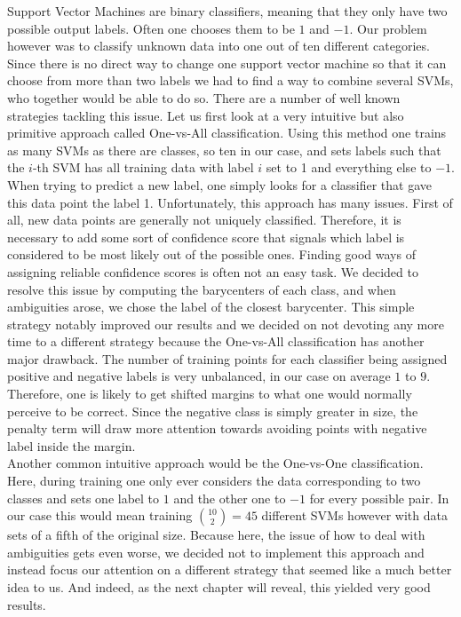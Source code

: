 Support Vector Machines are binary classifiers, meaning that they only have two possible output labels. Often one chooses them to be $1$ and $-1$. Our problem however was to classify unknown data into one out of ten different categories. Since there is no direct way to change one support vector machine so that it can choose from more than two labels we had to find a way to combine several SVMs, who together would be able to do so. There are a number of well known strategies tackling this issue. Let us first look at a very intuitive but also primitive approach called One-vs-All classification. Using this method one trains as many SVMs as there are classes, so ten in our case, and sets labels such that the $i$-th SVM has all training data with label $i$ set to 1 and everything else to $-1$. When trying to predict a new label, one simply looks for a classifier that gave this data point the label 1. Unfortunately, this approach has many issues. First of all, new data points are generally not uniquely classified. Therefore, it is necessary to add some sort of confidence score that signals which label is considered to be most likely out of the possible ones. Finding good ways of assigning reliable confidence scores is often not an easy task. We decided to resolve this issue by computing the barycenters of each class, and when ambiguities arose, we chose the label of the closest barycenter. This simple strategy notably improved our results and we decided on not devoting any more time to a different strategy because the One-vs-All classification has another major drawback. The number of training points for each classifier being assigned positive and negative labels is very unbalanced, in our case on average $1$ to $9$. Therefore, one is likely to get shifted margins to what one would normally perceive to be correct. Since the negative class is simply greater in size, the penalty term will draw more attention towards avoiding points with negative label inside the margin.\\ 

Another common intuitive approach would be the One-vs-One classification. Here, during training one only ever considers the data corresponding to two classes and sets one label to $1$ and the other one to $-1$ for every possible pair. 
In our case this would mean training $\binom{10}{2} =45$ different SVMs however with data sets of a fifth of the original size. Because here, the issue of how to deal with ambiguities gets even worse, we decided not to implement this approach and instead focus our attention on a different strategy that seemed like a much better idea to us. And indeed, as the next chapter will reveal, this yielded very good results.

